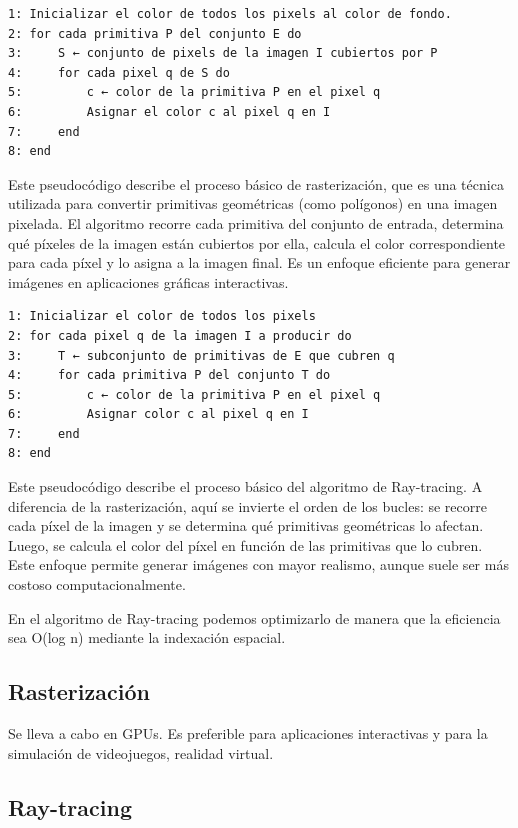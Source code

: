 \documentclass[12pt]{report} %
\begin{document}
\begin{lstlisting}
1: Inicializar el color de todos los pixels al color de fondo.
2: for cada primitiva P del conjunto E do
3:     S ← conjunto de pixels de la imagen I cubiertos por P
4:     for cada pixel q de S do
5:         c ← color de la primitiva P en el pixel q
6:         Asignar el color c al pixel q en I
7:     end
8: end
\end{lstlisting}

Este pseudocódigo describe el proceso básico de rasterización, que es
una técnica utilizada para convertir primitivas geométricas (como
polígonos) en una imagen pixelada. El algoritmo recorre cada primitiva
del conjunto de entrada, determina qué píxeles de la imagen están
cubiertos por ella, calcula el color correspondiente para cada píxel y
lo asigna a la imagen final. Es un enfoque eficiente para generar
imágenes en aplicaciones gráficas interactivas.

\begin{lstlisting}
1: Inicializar el color de todos los pixels
2: for cada pixel q de la imagen I a producir do
3:     T ← subconjunto de primitivas de E que cubren q
4:     for cada primitiva P del conjunto T do
5:         c ← color de la primitiva P en el pixel q
6:         Asignar color c al pixel q en I
7:     end
8: end
\end{lstlisting}

Este pseudocódigo describe el proceso básico del algoritmo de
Ray-tracing. A diferencia de la rasterización, aquí se invierte el orden
de los bucles: se recorre cada píxel de la imagen y se determina qué
primitivas geométricas lo afectan. Luego, se calcula el color del píxel
en función de las primitivas que lo cubren. Este enfoque permite generar
imágenes con mayor realismo, aunque suele ser más costoso
computacionalmente.

En el algoritmo de Ray-tracing podemos optimizarlo de manera que la
eficiencia sea O(log n) mediante la indexación espacial.

\hypertarget{rasterizaciuxf3n}{%
\subsection{Rasterización}\label{rasterizaciuxf3n}}

Se lleva a cabo en GPUs. Es preferible para aplicaciones interactivas y
para la simulación de videojuegos, realidad virtual.

\hypertarget{ray-tracing}{%
\subsection{Ray-tracing}\label{ray-tracing}}
\end{document}
